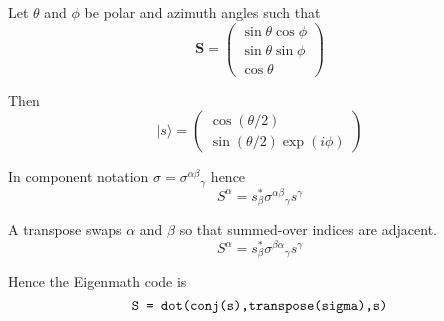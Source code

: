 \documentclass[12pt]{article}
\begin{document}
Let $\theta$ and $\phi$ be polar and azimuth angles such that
\begin{equation*}
\mathbf S=\begin{pmatrix}\sin\theta\cos\phi\\\sin\theta\sin\phi\\\cos\theta\end{pmatrix}
\end{equation*}

Then
\begin{equation*}
|s\rangle=\begin{pmatrix}\cos(\theta/2)\\\sin(\theta/2)\exp(i\phi)\end{pmatrix}
\end{equation*}

In component notation $\sigma=\sigma^{\alpha\beta}{}_\gamma$ hence
\begin{equation*}
S^\alpha=s_\beta^*\sigma^{\alpha\beta}{}_\gamma s^\gamma
\end{equation*}

A transpose swaps $\alpha$ and $\beta$ so that summed-over indices are adjacent.
\begin{equation*}
S^\alpha=s_\beta^*\sigma^{\beta\alpha}{}_\gamma s^\gamma
\end{equation*}

Hence the Eigenmath code is
\begin{equation*}
\text{\tt S = dot(conj(s),transpose(sigma),s)}
\end{equation*}
\end{document}
